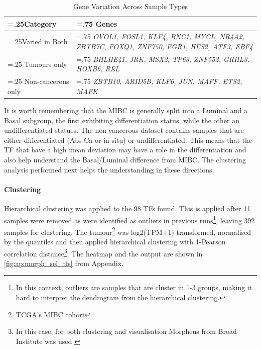 \begin{table}[htbp]
  \centering
  \begin{tabularx}{\textwidth}{>{\hsize=.25\hsize}X|>{\hsize=.75\hsize}X}
    \toprule
    \textbf{Category} & \textbf{Genes} \\
    \midrule
    Varied in Both & \textit{OVOL1, FOSL1, KLF4, BNC1, MYCL, NR4A2, ZBTB7C, FOXQ1, ZNF750, EGR1, HES2, ATF3, EBF4} \\
    \midrule
    Tumours only & \textit{BHLHE41, JRK, MSX2, TP63, ZNF552, GRHL3, HOXB6, REL} \\
    \midrule
    Non-cancerous only & \textit{ZBTB10, ARID5B, KLF6, JUN, MAFF, ETS2, MAFK} \\
    \bottomrule
  \end{tabularx}
    \caption{Gene Variation Across Sample Types} %
    \label{tab:N_I:sel_tfs_var}
\end{table}

It is worth remembering that the MIBC is generally split into a Luminal and a Basal subgroup, the first exhibiting differentiation status, while the other an undifferentiated statues. The non-cancerous dataset contains samples that are either differentiated (Abs-Ca or in-situ) or undifferentiated. This means that the TF that have a high mean deviation may have a role in the differentiation and also help understand the Basal/Luminal difference from MIBC. The clustering analysis performed next helps the understanding in these directions.

\paragraph*{Clustering}


Hierarchical clustering was applied to the 98 TFs found. This is applied after 11 samples were removed as were identified as outliers in previous runs\footnote{In this context, outliers are samples that are cluster in 1-3 groups, making it hard to interpret the dendrogram from the hierarchical clustering.}, leaving 392 samples for clustering.  The tumour\footnote{TCGA's MIBC cohort} was log2(TPM+1) transformed, normalised by the quantiles and then applied hierarchical clustering with 1-Pearson correlation distance\footnote{In this case, for both clustering and visualisation Morpheus from Broad Institute was used \cite{noauthor_undated-uz}}. The heatmap and the output are shown in \cref{fig:ap:morph_sel_tfs} from Appendix.

